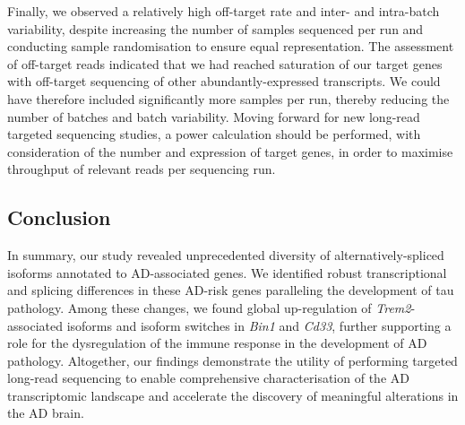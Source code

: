 Finally, we observed a relatively high off-target rate and inter- and intra-batch variability, despite increasing the number of samples sequenced per run and conducting sample randomisation to ensure equal representation. The assessment of off-target reads indicated that we had reached saturation of our target genes with off-target sequencing of other abundantly-expressed transcripts. We could have therefore included significantly more samples per run, thereby reducing the number of batches and batch variability. Moving forward for new long-read targeted sequencing studies, a power calculation should be performed, with consideration of the number and expression of target genes, in order to maximise throughput of relevant reads per sequencing run.      
    
\subsection{Conclusion}
In summary, our study revealed unprecedented diversity of alternatively-spliced isoforms annotated to AD-associated genes. We identified robust transcriptional and splicing differences in these AD-risk genes paralleling the development of tau pathology. Among these changes, we found global up-regulation of \textit{Trem2}-associated isoforms and isoform switches in \textit{Bin1} and \textit{Cd33}, further supporting a role for the dysregulation of the immune response in the development of AD pathology. Altogether, our findings demonstrate the utility of performing targeted long-read sequencing to enable comprehensive characterisation of the AD transcriptomic landscape and accelerate the discovery of meaningful alterations in the AD brain.  


